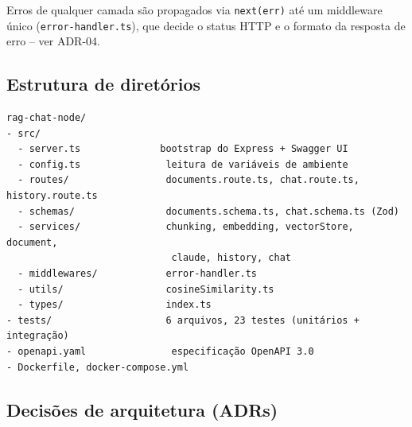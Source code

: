 \documentclass[11pt,a4paper]{article}
\begin{document}
Erros de qualquer camada são propagados via \texttt{next(err)} até um middleware
único (\texttt{error-handler.ts}), que decide o status HTTP e o formato da resposta
de erro -- ver ADR-04.

\subsection{Estrutura de diretórios}

\begin{lstlisting}
rag-chat-node/
- src/
  - server.ts              bootstrap do Express + Swagger UI
  - config.ts               leitura de variáveis de ambiente
  - routes/                 documents.route.ts, chat.route.ts, history.route.ts
  - schemas/                documents.schema.ts, chat.schema.ts (Zod)
  - services/               chunking, embedding, vectorStore, document,
                             claude, history, chat
  - middlewares/            error-handler.ts
  - utils/                  cosineSimilarity.ts
  - types/                  index.ts
- tests/                    6 arquivos, 23 testes (unitários + integração)
- openapi.yaml               especificação OpenAPI 3.0
- Dockerfile, docker-compose.yml
\end{lstlisting}

\subsection{Decisões de arquitetura (ADRs)}
\end{document}
